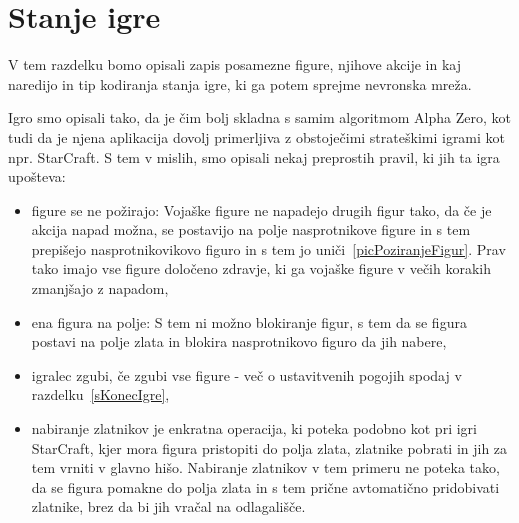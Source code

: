 \documentclass[a4paper, 12pt]{book}
\begin{document}
\section{Stanje igre}
\label{stanjeigre}
V tem razdelku bomo opisali zapis posamezne figure, njihove akcije in kaj naredijo in tip kodiranja stanja igre, ki ga potem sprejme nevronska mreža.

Igro smo opisali tako, da je čim bolj skladna s samim algoritmom Alpha Zero, kot tudi da je njena aplikacija dovolj primerljiva z obstoječimi strateškimi igrami kot npr. StarCraft.
S tem v mislih, smo opisali nekaj preprostih pravil, ki jih ta igra upošteva:
\begin{itemize}
	\item figure se ne požirajo: Vojaške figure ne napadejo drugih figur tako, da če je akcija napad možna, se postavijo na polje nasprotnikove figure in s tem prepišejo nasprotnikovikovo figuro in s tem jo uniči~\ref{picPoziranjeFigur}. 
	Prav tako imajo vse figure določeno zdravje, ki ga vojaške figure v večih korakih zmanjšajo z napadom,
	\item ena figura na polje: S tem ni možno blokiranje figur, s tem da se figura postavi na polje zlata in blokira nasprotnikovo figuro da jih nabere,
	\item igralec zgubi, če zgubi vse figure - več o ustavitvenih pogojih spodaj v razdelku~\ref{sKonecIgre},
	\item nabiranje zlatnikov je enkratna operacija, ki poteka podobno kot pri igri StarCraft, kjer mora figura pristopiti do polja zlata, zlatnike pobrati in jih za tem vrniti v glavno hišo.
	Nabiranje zlatnikov v tem primeru ne poteka tako, da se figura pomakne do polja zlata in s tem prične avtomatično pridobivati zlatnike, brez da bi jih vračal na odlagališče.

\end{itemize}
\end{document}

